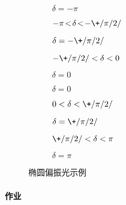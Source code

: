\documentclass{ctexart}
\begin{document}
\begin{figure}[htbp]
    \centering
    \begin{subfigure}{.19\textwidth}
        \centering
        \caption{$\delta = -\pi$}
    \end{subfigure}
    \begin{subfigure}{.19\textwidth}
        \centering
        \caption{$-\pi\!<\!\delta\!<\!-\+/\pi/2/$}
    \end{subfigure}
    \begin{subfigure}{.19\textwidth}
        \centering
        \caption{$\delta = -\+/\pi/2/$}
    \end{subfigure}
    \begin{subfigure}{.19\textwidth}
        \centering
        \caption{$-\+/\pi/2/<\delta<0$}
    \end{subfigure}
    \begin{subfigure}{.19\textwidth}
        \centering
        \caption{$\delta = 0$}
    \end{subfigure}
    \begin{subfigure}{.19\textwidth}
        \centering
        \caption{$\delta = 0$}
    \end{subfigure}
    \begin{subfigure}{.19\textwidth}
        \centering
        \caption{$0<\delta<\+/\pi/2/$}
    \end{subfigure}
    \begin{subfigure}{.19\textwidth}
        \centering
        \caption{$\delta=\+/\pi/2/$}
    \end{subfigure}
    \begin{subfigure}{.19\textwidth}
        \centering
        \caption{$\+/\pi/2/ < \delta < \pi$}
    \end{subfigure}
    \begin{subfigure}{.19\textwidth}
        \centering
        \caption{$\delta = \pi$}
    \end{subfigure}
    \caption{椭圆偏振光示例}
    \label{fig:椭圆偏振光示例}
\end{figure}

\paragraph{作业} %
\label{par:作业}
\end{document}
